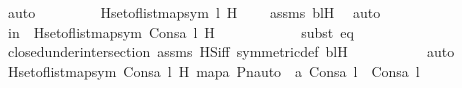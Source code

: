 \begin{isabellebody}
\ auto\isanewline
\isanewline
\ \ \ \ \ \ \isamarkupfalse%
\ {\isachardoublequoteopen}\ {\isacharparenleft}{\kern0pt}{\isasymInter}H{\isasymin}set{\isacharunderscore}{\kern0pt}of{\isacharunderscore}{\kern0pt}list{\isacharparenleft}{\kern0pt}map{\isacharparenleft}{\kern0pt}sym{\isacharcomma}{\kern0pt}\ l{\isacharparenright}{\kern0pt}{\isacharparenright}{\kern0pt}{\isachardot}{\kern0pt}\ H{\isacharparenright}{\kern0pt}\ {\isasymin}\ {\isasymF}{\isachardoublequoteclose}\ \isamarkupfalse%
\ assms\ bl{\isacharprime}{\kern0pt}H\ \isamarkupfalse%
\ auto\isanewline
\ \ \ \ \ \ \isamarkupfalse%
\ \isamarkupfalse%
\ in{\isasymF}\ {\isacharcolon}{\kern0pt}\ {\isachardoublequoteopen}{\isacharparenleft}{\kern0pt}{\isasymInter}H{\isasymin}set{\isacharunderscore}{\kern0pt}of{\isacharunderscore}{\kern0pt}list{\isacharparenleft}{\kern0pt}map{\isacharparenleft}{\kern0pt}sym{\isacharcomma}{\kern0pt}\ Cons{\isacharparenleft}{\kern0pt}a{\isacharcomma}{\kern0pt}\ l{\isacharparenright}{\kern0pt}{\isacharparenright}{\kern0pt}{\isacharparenright}{\kern0pt}{\isachardot}{\kern0pt}\ H{\isacharparenright}{\kern0pt}\ {\isasymin}\ {\isasymF}{\isachardoublequoteclose}\ \isanewline
\ \ \ \ \ \ \ \ \isamarkupfalse%
{\isacharparenleft}{\kern0pt}subst\ eq{\isacharparenright}{\kern0pt}\isanewline
\ \ \ \ \ \ \ \ \isamarkupfalse%
\ {\isasymF}{\isacharunderscore}{\kern0pt}closed{\isacharunderscore}{\kern0pt}under{\isacharunderscore}{\kern0pt}intersection\ assms\ HS{\isacharunderscore}{\kern0pt}iff\ symmetric{\isacharunderscore}{\kern0pt}def\ bl{\isacharprime}{\kern0pt}H\ \isanewline
\ \ \ \ \ \ \ \ \isamarkupfalse%
\ auto\isanewline
\isanewline
\ \ \ \ \ \ \isamarkupfalse%
\ {\isachardoublequoteopen}{\isasymforall}{\isasympi}{\isasymin}{\isasymInter}H{\isasymin}set{\isacharunderscore}{\kern0pt}of{\isacharunderscore}{\kern0pt}list{\isacharparenleft}{\kern0pt}map{\isacharparenleft}{\kern0pt}sym{\isacharcomma}{\kern0pt}\ Cons{\isacharparenleft}{\kern0pt}a{\isacharcomma}{\kern0pt}\ l{\isacharparenright}{\kern0pt}{\isacharparenright}{\kern0pt}{\isacharparenright}{\kern0pt}{\isachardot}{\kern0pt}\ H{\isachardot}{\kern0pt}\ map{\isacharparenleft}{\kern0pt}{\isasymlambda}a{\isachardot}{\kern0pt}\ Pn{\isacharunderscore}{\kern0pt}auto{\isacharparenleft}{\kern0pt}{\isasympi}{\isacharparenright}{\kern0pt}\ {\isacharbackquote}{\kern0pt}\ a{\isacharcomma}{\kern0pt}\ Cons{\isacharparenleft}{\kern0pt}a{\isacharcomma}{\kern0pt}\ l{\isacharparenright}{\kern0pt}{\isacharparenright}{\kern0pt}\ {\isacharequal}{\kern0pt}\ Cons{\isacharparenleft}{\kern0pt}a{\isacharcomma}{\kern0pt}\ l{\isacharparenright}{\kern0pt}{\isachardoublequoteclose}\isanewline

\end{isabellebody}
